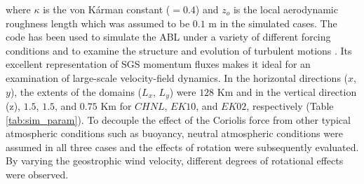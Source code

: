 \noindent where $\kappa$ is the von K\'arman constant ($=0.4$) and $z_o$ is the local aerodynamic roughness length which was assumed to be $0.1$ m in the simulated cases. The code has been used to simulate the ABL under a variety of different forcing conditions \citep[e.g.,][]{stoll_jas_2009,bailey_blm_2013,miller_blm_2013} and to examine the structure and evolution of turbulent motions \citep[e.g.,][]{bailey_ae_2014,bailey_jfm_2016}.  Its excellent representation of SGS momentum fluxes \citep{stoll_wrr_2006} makes it ideal for an examination of large-scale velocity-field dynamics. In the horizontal directions ($x$, $y$), the extents of the domains ($L_x$, $L_y$) were $128$ Km and in the vertical direction (z), $1.5$, $1.5$, and $0.75$ Km for $CHNL$, $EK10$, and $EK02$, respectively (Table \ref{tab:sim_param}).  To decouple the effect of the Coriolis force from other typical atmospheric conditions such as buoyancy, neutral atmospheric conditions were assumed in all three cases and the effects of rotation were subsequently evaluated. By varying the geostrophic wind velocity, different degrees of rotational effects were observed. 

